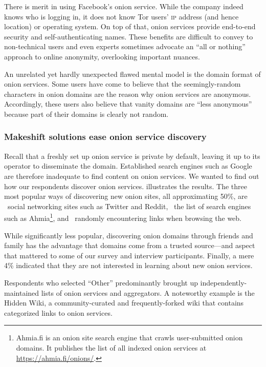 There is merit in using Facebook's onion service.  While the company indeed
knows who is logging in, it does not know Tor users' \textsc{ip} address (and
hence location) or operating system.  On top of that, onion services provide
end-to-end security and self-authenticating names.  These benefits are difficult
to convey to non-technical users and even experts sometimes advocate an ``all or
nothing'' approach to online anonymity, overlooking important nuances.

An unrelated yet hardly unexpected flawed mental model is the domain format of
onion services.  Some users have come to believe that the seemingly-random
characters in onion domains are the reason why onion services are anonymous.
Accordingly, these users also believe that vanity domains are ``less anonymous''
because part of their domains is clearly not random.

\subsubsection{Makeshift solutions ease onion service discovery}

Recall that a freshly set up onion service is private by default, leaving it up
to its operator to disseminate the domain.  Established search engines such as
Google are therefore inadequate to find content on onion services.  We wanted to
find out how our respondents discover onion services.
 illustrates the results.  The three most popular ways
of discovering new onion sites, all approximating 50\%, are \first~social
networking sites such as Twitter and Reddit, \second~the list of search engines
such as Ahmia\footnote{Ahmia.fi is an onion site search engine that crawls
user-submitted onion domains.  It publishes the list of all indexed onion
services at \url{https://ahmia.fi/onions/}.}, and \third~randomly encountering
links when browsing the web.

While significantly less popular, discovering onion domains through friends and
family has the advantage that domains come from a trusted source---and aspect
that mattered to some of our survey and interview participants.  Finally, a mere
4\% indicated that they are not interested in learning about new onion services.

Respondents who selected ``Other'' predominantly brought up
independently-maintained lists of onion services and aggregators.  A noteworthy
example is the Hidden Wiki, a community-curated and frequently-forked wiki that
contains categorized links to onion services.

